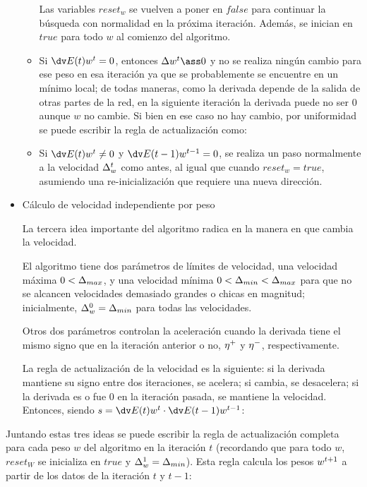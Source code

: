 \begin{itemize}
\begin{itemize}
Las variables $reset_w$ se vuelven a poner en $false$ para continuar la búsqueda con normalidad en la próxima iteración. Además, se inician en $true$ para todo $w$ al comienzo del algoritmo.

\item Si $\dvt =0$, entonces $\dwt \ass 0$ y no se realiza ningún cambio para ese peso en esa iteración ya que se probablemente se encuentre en un mínimo local; de todas maneras, como la derivada depende de la salida de otras partes de la red, en la siguiente iteración la derivada puede no ser $0$ aunque $w$ no cambie. Si bien en ese caso no hay cambio, por uniformidad se puede escribir la regla de actualización como:


\item 
Si $\dvt \neq 0$ y $\dvtm =0$, se realiza un paso normalmente a la velocidad $\Delta^{t}_w$ como antes, al igual que cuando $reset_w=true$, asumiendo una re-inicialización que requiere una nueva dirección. 


\end{itemize}

\item Cálculo de velocidad independiente por peso

La tercera idea importante del algoritmo radica en la manera en que cambia la velocidad.
 
El algoritmo tiene dos parámetros de límites de velocidad, una velocidad máxima $0<\Delta_{max}$, y una velocidad mínima $0<\Delta_{min}<\Delta_{max}$ para que no se alcancen velocidades demasiado grandes o chicas en magnitud; inicialmente, $\Delta_w^0=\Delta_{min}$ para todas las velocidades. 

Otros dos parámetros controlan la aceleración cuando la derivada tiene el mismo signo que en la iteración anterior o no, $\eta^+$ y $\eta^-$, respectivamente. 

La regla de actualización de la velocidad es la siguiente: si la derivada mantiene su signo entre dos iteraciones, se acelera; si cambia, se desacelera; si la derivada es o fue $0$ en la iteración pasada, se mantiene la velocidad. Entonces, siendo $s=\multidv$:



\end{itemize}
Juntando estas tres ideas se puede escribir la regla de actualización completa para cada peso $w$ del algoritmo en la iteración $t$ (recordando que para todo $w$, $reset_W$ se inicializa en $true$ y $\Delta_w^1=\Delta_{min}$). Esta regla calcula los pesos $w^{t+1}$ a partir de los datos de la iteración $t$ y $t-1$:

